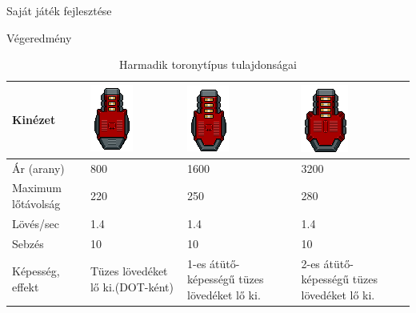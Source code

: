 \begin{MyChapter}{Saját játék fejlesztése}
\begin{MySection}{Végeredmény}
		\begin{table}[H]
			\centering
			\caption{Harmadik toronytípus tulajdonságai}
			\label{tab:torony_tipus_2}
			\begin{tabular}{|L{3.75cm}|C{3.07cm}|C{3.06cm}|C{3.06cm}|}
				\hline
				Kinézet & \includegraphics[scale=0.63]{kepek/jatekHasznalat/torony_21} & \includegraphics[scale=0.63]{kepek/jatekHasznalat/torony_22} & \includegraphics[scale=0.63]{kepek/jatekHasznalat/torony_23} \\ \hline
				Ár (arany) & 800 & 1600 & 3200 \\ \hline
				Maximum lőtávolság & 220 & 250 & 280 \\ \hline
				Lövés/sec & 1.4 & 1.4 & 1.4 \\ \hline
				Sebzés & 10 & 10 & 10 \\ \hline
				Képesség, effekt & Tüzes lövedéket lő ki.(DOT-ként) & 1-es átütő- képességű tüzes lövedéket lő ki. & 2-es átütő- képességű tüzes lövedéket lő ki. \\ \hline
			\end{tabular}
		\end{table}
	
	

\end{MySection}
\end{MyChapter}
